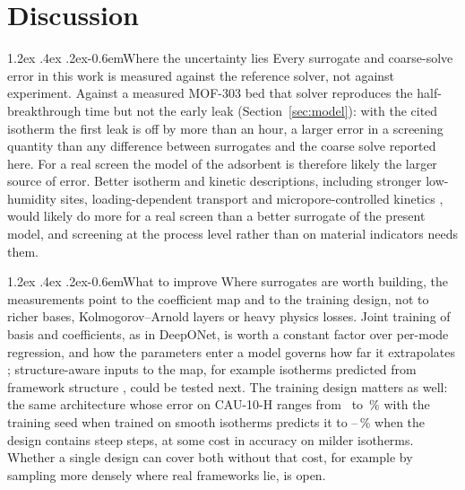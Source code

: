 \documentclass[10pt,a4paper]{article}
\makeatletter
\renewcommand\paragraph{\@startsection{paragraph}{4}{\z@}%
  {1.2ex \@plus .4ex \@minus .2ex}{-0.6em}{\normalfont\normalsize\bfseries}}
\makeatother
\begin{document}
\section{Discussion}
\label{sec:discussion}

\paragraph{Where the uncertainty lies} Every surrogate and coarse-solve error in this work
is measured against the reference solver, not against experiment. Against a measured
MOF-303 bed that solver reproduces the half-breakthrough time but not the early leak
(Section~\ref{sec:model}): with the cited isotherm the first leak is off by more than an
hour, a larger error in a screening quantity than any difference between surrogates and the
coarse solve reported here. For a real screen the model of the adsorbent is therefore likely
the larger source of error. Better isotherm and kinetic descriptions, including stronger
low-humidity sites, loading-dependent transport and micropore-controlled kinetics
\cite{hastings2024high,sircar2000why}, would likely do more for a real screen than a better
surrogate of the present model, and screening at the process level rather than on material
indicators \cite{farmahini2021performance} needs them.

\paragraph{What to improve} Where surrogates are worth building, the measurements point to
the coefficient map and to the training design, not to richer bases, Kolmogorov--Arnold
layers or heavy physics losses. Joint training of basis and coefficients, as in DeepONet,
is worth a constant factor over per-mode regression, and how the parameters enter a model
governs how far it extrapolates \cite{vantegelen2026late}; structure-aware inputs to the
map, for example isotherms predicted from framework structure \cite{goeminne2025ab}, could
be tested next. The training design matters as well: the same architecture whose error on
CAU-10-H ranges from \nSeedCauMin\ to \nSeedCauMax\,\% with the training seed when trained on
smooth isotherms predicts it to \nFwAVthreeDonCauMin--\nFwAVthreeDonCauMax\,\% when the
design contains steep steps, at some cost in accuracy on milder isotherms. Whether a single
design can cover both without that cost, for example by sampling more densely where real
frameworks lie, is open.
\end{document}
